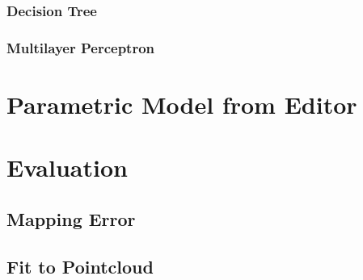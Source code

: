 \subsubsection{Decision Tree}

\subsubsection{Multilayer Perceptron}

\section{Parametric Model from Editor}

\section{Evaluation}

\subsection{Mapping Error}

\subsection{Fit to Pointcloud}
